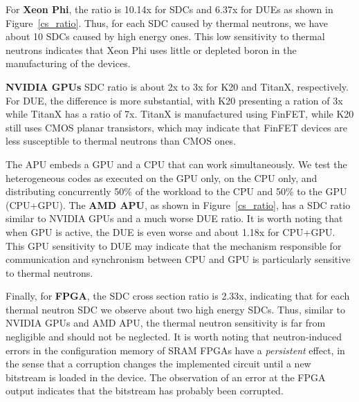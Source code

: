 For \textbf{Xeon Phi}, the ratio is 10.14x for SDCs and 6.37x for DUEs as shown in Figure~\ref{cs_ratio}. Thus, for each SDC caused by thermal neutrons, we have about 10 SDCs caused by high energy ones. This low sensitivity to thermal neutrons indicates that Xeon Phi uses little or depleted boron in the manufacturing of the devices.

\textbf{NVIDIA GPUs} SDC ratio is about 2x to 3x for K20 and TitanX, respectively. For DUE, the difference is more substantial, with K20 presenting a ration of 3x while TitanX has a ratio of 7x. TitanX is manufactured using FinFET, while K20 still uses CMOS planar transistors, which may indicate that FinFET devices are less susceptible to thermal neutrons than CMOS ones.

The APU embeds a GPU and a CPU that can work simultaneously. We test the heterogeneous codes as executed on the GPU only, on the CPU only, and distributing concurrently 50\% of the workload to the CPU and 50\% to the GPU (CPU+GPU). The \textbf{AMD APU}, as shown in Figure~\ref{cs_ratio}, has a SDC ratio similar to NVIDIA GPUs and a much worse DUE ratio. It is worth noting that when GPU is active, the DUE is even worse and about 1.18x for CPU+GPU. This GPU sensitivity to DUE may indicate that the mechanism responsible for communication and synchronism between CPU and GPU is particularly sensitive to thermal neutrons.

Finally, for \textbf{FPGA}, the SDC cross section ratio is 2.33x, indicating that for each thermal neutron SDC we observe about two high energy SDCs. Thus, similar to NVIDIA GPUs and AMD APU, the thermal neutron sensitivity is far from negligible and should not be neglected.
It is worth noting that neutron-induced errors in the configuration memory of SRAM FPGAs have a \textit{persistent} effect, in the sense that a corruption changes the implemented circuit until a new bitstream is loaded in the device. The observation of an error at the FPGA output indicates that the bitstream has probably been corrupted. 




